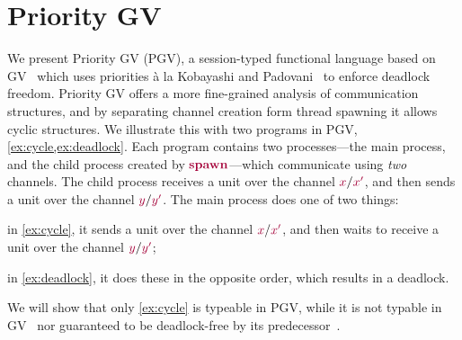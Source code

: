 \documentclass[main.tex]{subfiles}
\begin{document}
\section{Priority GV}\label{sec:pgv}

We present Priority GV (PGV), a session-typed functional language based on GV~\cite{wadler15,lindleymorris15} which uses priorities \`{a} la Kobayashi and Padovani~\cite{kobayashi06,padovaninovara15} to enforce deadlock freedom.
Priority GV offers a more fine-grained analysis of communication structures, and by separating channel creation form thread spawning it allows cyclic structures.
We illustrate this with two programs in PGV, \cref{ex:cycle,ex:deadlock}. Each program contains two processes---the main process, and the child process created by $\tm{\spawn}$---which communicate using \emph{two} channels. The child process receives a unit over the channel $\tm{x}/\tm{x'}$, and then sends a unit over the channel $\tm{y}/\tm{y'}$. The main process does one of two things:
\begin{enumerate*}[label=(\alph*)]
\item in \cref{ex:cycle}, it sends a unit over the channel $\tm{x}/\tm{x'}$, and then waits to receive a unit over the channel $\tm{y}/\tm{y'}$;
\item in \cref{ex:deadlock}, it does these in the opposite order, which results in a deadlock.
\end{enumerate*}
We will show that only \cref{ex:cycle} is typeable in PGV, while it is not typable in GV~\cite{wadler14} nor guaranteed to be deadlock-free by its predecessor~\cite{gayvasconcelos10}.
\end{document}
